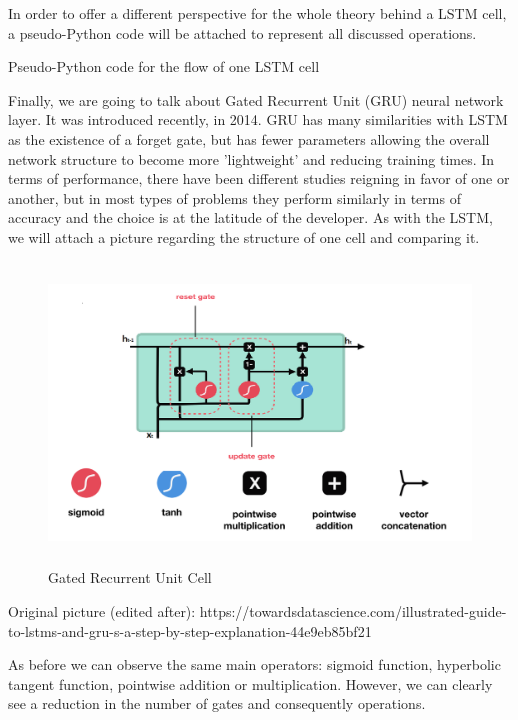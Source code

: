 In order to offer a different perspective for the whole theory behind a LSTM cell, a pseudo-Python code will be attached to represent all discussed operations.

\begin{algorithm}
\caption{Pseudo-Python code for the flow of one LSTM cell}
\label{lstmcellpseudocode}

\end{algorithm}

Finally, we are going to talk about Gated Recurrent Unit (GRU) neural network layer. It was introduced recently, in 2014. GRU has many similarities with LSTM as the existence of a forget gate, but has fewer parameters allowing the overall network structure to become more 'lightweight' and reducing training times. In terms of performance, there have been different studies reigning in favor of one or another, but in most types of problems they perform similarly in terms of accuracy and the choice is at the latitude of the developer. As with the LSTM, we will attach a picture regarding the structure of one cell and comparing it.

\begin{figure}[H]
\centering
\includegraphics[height=8cm]{images/GRUCell.png} 
\caption{Gated Recurrent Unit Cell}
\label{fig:grucell}
\end{figure}
\begin{flushright}
Original picture (edited after): https://towardsdatascience.com/illustrated-guide-to-lstms-and-gru-s-a-step-by-step-explanation-44e9eb85bf21
\end{flushright}


As before we can observe the same main operators: sigmoid function, hyperbolic tangent function, pointwise addition or multiplication. However, we can clearly see a reduction in the number of gates and consequently operations.

